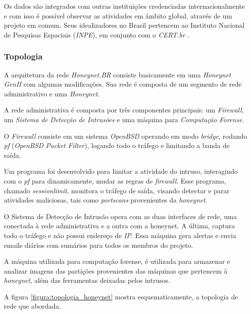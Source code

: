 Os dados são integrados com outras instituições credenciadas internacionalmente e com isso é possível observar as atividades em âmbito global, através de um projeto em comum. Seus idealizadores no Brasil pertencem ao Instituto Nacional de Pesquisas Espaciais (\textit{INPE}), em conjunto com o \textit{CERT.br} . \cite{CERTBRHoney}

\subsubsection{Topologia}

A arquitetura da rede \textit{Honeynet.BR} consiste basicamente em uma \textit{Honeynet GenII} com algumas modificações. Sua rede é composta de um segmento de rede administrativo e uma \textit{Honeynet}.

A rede administrativa é composta por três componentes principais: um \textit{Firewall}, um \textit{Sistema de Detecção de Intrusões} e uma máquina para \textit{Computação Forense}.

O \textit{Firewall} consiste em um sistema \textit{OpenBSD} operando em modo \textit{bridge}, rodando \textit{pf} (\textit{OpenBSD Packet Filter}), logando todo o tráfego e limitando a banda de saída.

Um programa foi desenvolvido para limitar a atividade do intruso, interagindo com o \textit{pf} para dinamicamente, mudar as regras de \textit{firewall}. Esse programa, chamado \textit{sessionlimit}, monitora o tráfego de saída, visando detectar e parar atividades maliciosas, tais como \textit{portscans} provenientes da \textit{honeynet}.

O Sistema de Detecção de Intrusão opera com as duas interfaces de rede, uma conectada à rede administrativa e a outra com a honeynet. A última, captura todo o tráfego e não possui endereço de \textit{IP}. Essa máquina gera alertas e envia emails diários com sumários para todos os membros do projeto.

A máquina utilizada para computação forense, é utilizada para armazenar e analizar imagens das partições provenientes das máquinas que pertencem à \textit{honeynet}, além das ferramentas deixadas pelos intrusos.

A figura \ref{figura:topologia_honeynet} mostra esquematicamente, a topologia de rede que abordada.

